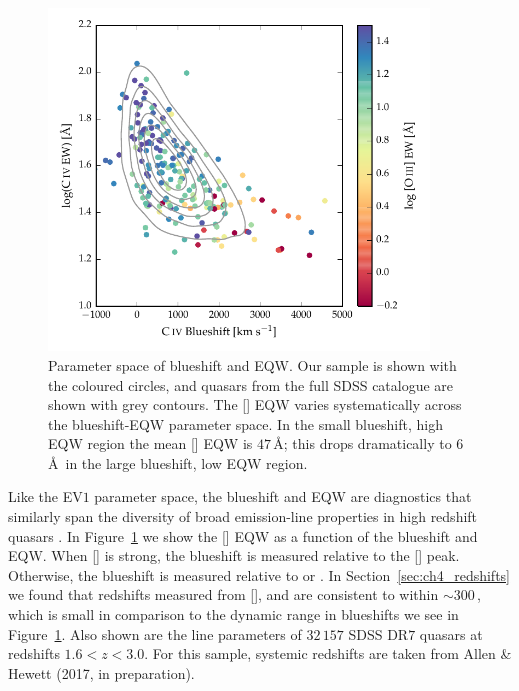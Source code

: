 \begin{figure}[t!]
\centering
    \includegraphics[width=0.9\textwidth]{figures/chapter04/ev1.pdf}
    \caption[{Parameter space of  blueshift and EQW.}]{Parameter space of  blueshift and EQW. Our sample is shown with the coloured circles, and quasars from the full SDSS catalogue are shown with grey contours. The [] EQW varies systematically across the  blueshift-EQW parameter space. In the small  blueshift, high EQW region the mean [] EQW is $47$\,\AA; this drops dramatically to $6$\AA\, in the large  blueshift, low EQW region.}
    \label{fig:ev1}
\end{figure}

Like the EV$1$ parameter space, the  blueshift and EQW are diagnostics that similarly span the diversity of broad emission-line properties in high redshift quasars \citep{sulentic07,richards11}.
In Figure~\ref{fig:ev1} we show the [] EQW as a function of the  blueshift and EQW.
When [] is strong, the  blueshift is measured relative to the [] peak.
Otherwise, the  blueshift is measured relative to \hb or \hans.
In Section~\ref{sec:ch4_redshifts} we found that redshifts measured from [], \hb and \ha are consistent to within $\sim300$\,\kms, which is small in comparison to the dynamic range in  blueshifts we see in Figure~\ref{fig:ev1}.
Also shown are the  line parameters of $32\,157$ SDSS DR$7$ quasars at redshifts $1.6 < z < 3.0$.
For this sample, systemic redshifts are taken from Allen \& Hewett (2017, in preparation).

